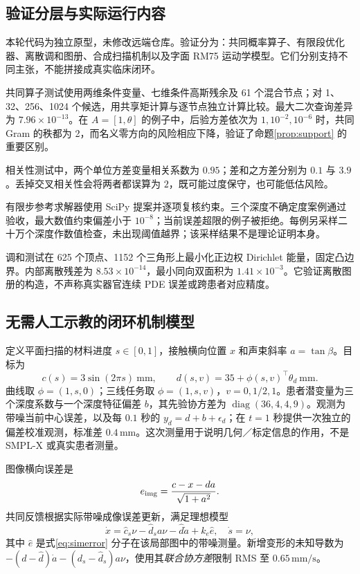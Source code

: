\documentclass[UTF8,11pt,a4paper,fontset=fandol]{ctexart}
\numberwithin{equation}{section}
\theoremstyle{definition}
\DeclareMathOperator{\diag}{diag}
\begin{document}
\subsection{验证分层与实际运行内容}
本轮代码为独立原型，未修改远端仓库。验证分为：共同概率算子、有限段优化器、离散调和图册、合成扫描机制以及字面 RM75 运动学模型。它们分别支持不同主张，不能拼接成真实临床闭环。

共同算子测试使用两维条件变量、七维条件高斯残余及 61 个混合节点；对 1、32、256、1024 个候选，用共享矩计算与逐节点独立计算比较。最大二次查询差异为 $7.96\times10^{-13}$。在 $A=[1,\theta]$ 的例子中，后验方差依次为 $1,10^{-2},10^{-6}$ 时，共同 Gram 的秩都为 2，而名义零方向的风险相应下降，验证了命题\ref{prop:support} 的重要区别。

相关性测试中，两个单位方差变量相关系数为 $0.95$；差和之方差分别为 $0.1$ 与 $3.9$。丢掉交叉相关性会将两者都误算为 $2$，既可能过度保守，也可能低估风险。

有限步参考求解器使用 SciPy 提案并逐项复核约束。三个深度不确定度案例通过验收，最大数值约束偏差小于 $10^{-8}$；当前误差超限的例子被拒绝。每例另采样二十万个深度作数值检查，未出现阈值越界；该采样结果不是理论证明本身。

调和测试在 625 个顶点、1152 个三角形上最小化正边权 Dirichlet 能量，固定凸边界。内部离散残差为 $8.53\times10^{-14}$，最小同向双面积为 $1.41\times10^{-3}$。它验证离散图册的构造，不声称真实器官连续 PDE 误差或跨患者对应精度。

\subsection{无需人工示教的闭环机制模型}
定义平面扫描的材料进度 $s\in[0,1]$，接触横向位置 $x$ 和声束斜率 $a=\tan\beta$。目标为
\begin{equation}
 c(s)=3\sin(2\pi s)\ \mathrm{mm},\qquad
 d(s,v)=35+\phi(s,v)^\top\theta_d\ \mathrm{mm}.
 \label{eq:simtarget}
\end{equation}
曲线取 $\phi=(1,s,0)$；三线任务取 $\phi=(1,s,v)$，$v=0,1/2,1$。患者潜变量为三个深度系数与一个深度特征偏差 $b$，其先验协方差为 $\diag(36,4,4,9)$。观测为带噪当前中心误差，以及每 $0.1$ 秒的 $y_d=d+b+\epsilon_d$；在 $t=1$ 秒提供一次独立的偏差校准观测，标准差 $0.4\,\mathrm{mm}$。这次测量用于说明几何／标定信息的作用，不是 SMPL-X 或真实患者测量。

图像横向误差是
\begin{equation}
 e_{\rm img}=\frac{c-x-da}{\sqrt{1+a^2}}.
 \label{eq:simerror}
\end{equation}
共同反馈根据实际带噪成像误差更新，满足理想模型
\begin{equation}
 \dot x=\hat c_s\nu-\hat d_s a\nu-\hat d\dot a+k_e\hat e,
 \quad \dot s=\nu,
 \label{eq:simcontroller}
\end{equation}
其中 $\hat e$ 是式\eqref{eq:simerror} 分子在该局部图中的带噪测量。新增变形的未知导数为
$-(d-\hat d)\dot a-(d_s-\hat d_s)a\nu$，使用其\emph{联合协方差}限制 RMS 至 $0.65\,\mathrm{mm/s}$。
\end{document}
